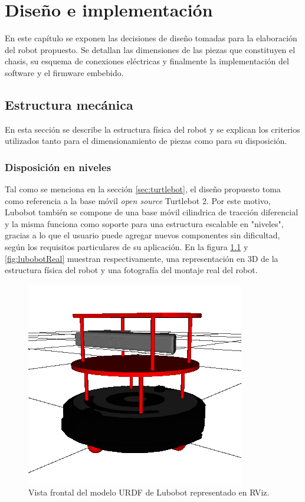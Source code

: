 \chapter{Diseño e implementación}

\label{Capitulo3}

En este capítulo se exponen las decisiones de diseño tomadas para la elaboración del robot propuesto. Se detallan las dimensiones de las piezas que constituyen el chasis, su esquema de conexiones eléctricas y finalmente la implementación del software y el firmware embebido.

\section{Estructura mecánica}

En esta sección se describe la estructura física del robot y se explican los criterios utilizados tanto para el dimensionamiento de piezas como para su disposición.

\subsection{Disposición en niveles}
Tal como se menciona en la sección \ref{sec:turtlebot}, el diseño propuesto toma como referencia a la base móvil \textit{open source} Turtlebot 2. Por este motivo, Lubobot también se compone de una base móvil cilindrica de tracción diferencial y la misma funciona como soporte para una estructura escalable en "niveles", gracias a lo que el usuario puede agregar nuevos componentes sin dificultad, según los requisitos particulares de su aplicación. En la figura \ref{fig:lubobotURDF} y \ref{fig:lubobotReal} muestran respectivamente, una representación en 3D de la estructura física del robot y una fotografía del montaje real del robot.

\begin{figure}[ht]
  \centering
  \includegraphics[scale=0.5]{./Figures/lubobot_urdf.png}
  \caption{Vista frontal del modelo URDF de Lubobot representado en RViz.}
  \label{fig:lubobotURDF}
\end{figure}

